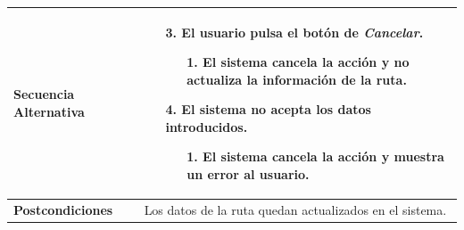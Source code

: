 \begin{longtable}{| p{4cm} | p{10cm} |}
\\
\hline
\textbf{Secuencia Alternativa} &\mbox{}\par\vspace{-\baselineskip}
\begin{enumerate}[leftmargin=0.9cm, topsep=0.1cm]
\item[3.] El usuario pulsa el botón de \textit{Cancelar}.
	\begin{itemize}
	\item[1.] El sistema cancela la acción y no actualiza la información de la ruta.
	\end{itemize}
\item[4.] El sistema no acepta los datos introducidos.
	\begin{itemize}
	\item[1.] El sistema cancela la acción y muestra un error al usuario.
	\end{itemize}
\end{enumerate}
\\

\hline
\textbf{Postcondiciones} & 
Los datos de la ruta quedan actualizados en el sistema.\\
\hline
\end{longtable}



\newpage
